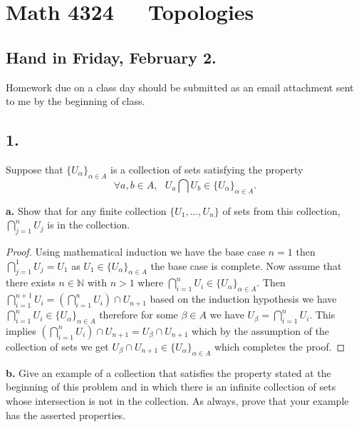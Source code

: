 \documentclass{amsart}
\theoremstyle{plain}
\theoremstyle{definition}
\theoremstyle{remark}
\begin{document}
\section*{Math 4324\ \ \  Topologies }

\subsection*{Hand in Friday, February 2.} Homework due on a class day should be submitted as an email attachment sent to me by the beginning of class.



\vspace{.15in}


\noindent
\subsection*{1.}  Suppose that $\{ U_{\alpha} \} _{\alpha \in A}$ is a collection of sets satisfying the property
\[
    \forall a, b \in A, \ \ \ U_a \bigcap U_b \in \{ U_{\alpha} \} _{\alpha \in A}.
\]

{\bfseries a.} Show that for any finite collection $\{ U_1, . . .  , U_n \}$ of sets from this collection,
${\displaystyle \bigcap _{j = 1} ^n U_j}$ is in the collection.

\begin{proof}
    Using mathematical induction we have the base case $n=1$ then $\bigcap_{j=1}^1U_j=U_1$ as $U_1\in \{U _\alpha\}_{\alpha \in A}$ the base case is complete. Now assume that there exists $n\in \mathbb{N}$ with $n>1$ where $\bigcap_{i=1}^{n}U_i\in \{U_\alpha\}_{\alpha\in A}$. Then $\bigcap_{i=1}^{n+1}U_i=(\bigcap_{i=1}^{n}U_i)\cap U_{n+1}$ based on the induction hypothesis we have $\bigcap_{i=1}^{n}U_i\in \{U_\alpha\}_{\alpha \in A}$ therefore for some $\beta \in A$ we have $U_{\beta}=\bigcap_{i=1}^{n}U_i$. This implies $(\bigcap_{i=1}^{n}U_i)\cap U_{n+1}=U_{\beta}\cap U_{n+1}$ which by the assumption of the collection of sets we get $U_\beta \cap U_{n+1}\in \{U_{\alpha}\}_{\alpha \in A}$ which completes the proof.
\end{proof}


{\bfseries b.} Give an example of a collection that satisfies the property stated at the beginning of this problem and in which there is an infinite collection of sets whose intersection is not in the collection. As always, prove that your example has the asserted properties.
\end{document}
